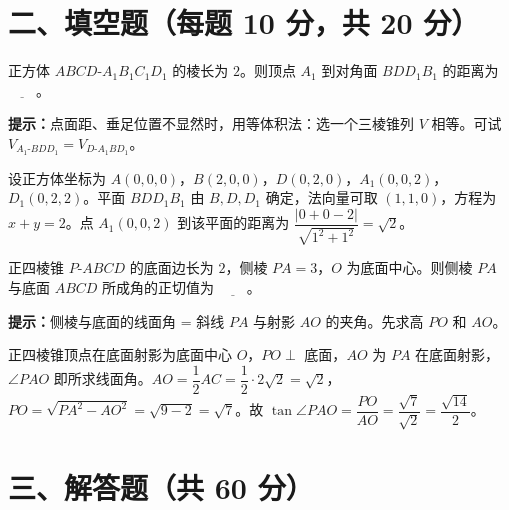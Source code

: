 \documentclass{exam-zh}
\begin{document}
\section*{二、填空题（每题 10 分，共 20 分）}


\begin{question}[points=10]
  正方体 $ABCD\text{-}A_1B_1C_1D_1$ 的棱长为 $2$。则顶点 $A_1$ 到对角面 $BDD_1B_1$ 的距离为 $\underline{\hspace{2em}}$。
  \begin{hintbox}
\textbf{提示：}点面距、垂足位置不显然时，用等体积法：选一个三棱锥列 $V$ 相等。可试 $V_{A_1\text{-}BDD_1}=V_{D\text{-}A_1BD_1}$。\end{hintbox}

  \paren[$\sqrt{2}$]
  \begin{solutionblock}
    设正方体坐标为 $A(0,0,0)$，$B(2,0,0)$，$D(0,2,0)$，$A_1(0,0,2)$，$D_1(0,2,2)$。平面 $BDD_1B_1$ 由 $B,D,D_1$ 确定，法向量可取 $(1,1,0)$，方程为 $x+y=2$。点 $A_1(0,0,2)$ 到该平面的距离为 $\dfrac{|0+0-2|}{\sqrt{1^2+1^2}}=\sqrt2$。
  \end{solutionblock}
\end{question}



\begin{question}[points=10]
  正四棱锥 $P\text{-}ABCD$ 的底面边长为 $2$，侧棱 $PA=3$，$O$ 为底面中心。则侧棱 $PA$ 与底面 $ABCD$ 所成角的正切值为 $\underline{\hspace{2em}}$。
  \begin{hintbox}
\textbf{提示：}侧棱与底面的线面角 = 斜线 $PA$ 与射影 $AO$ 的夹角。先求高 $PO$ 和 $AO$。\end{hintbox}

  \begin{solutionblock}
    正四棱锥顶点在底面射影为底面中心 $O$，$PO\perp$ 底面，$AO$ 为 $PA$ 在底面射影，$\angle PAO$ 即所求线面角。$AO=\dfrac12 AC=\dfrac12\cdot 2\sqrt2=\sqrt2$，$PO=\sqrt{PA^2-AO^2}=\sqrt{9-2}=\sqrt7$。故 $\tan\angle PAO=\dfrac{PO}{AO}=\dfrac{\sqrt7}{\sqrt2}=\dfrac{\sqrt{14}}{2}$。
  \end{solutionblock}
\end{question}


\section*{三、解答题（共 60 分）}

\end{document}
